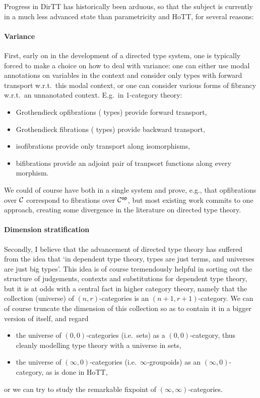 \documentclass{lmcs} %
\theoremstyle{plain}\newtheorem{satz}[thm]{Satz} %
\theoremstyle{plain}
\theoremstyle{definition}
\begin{document}
Progress in DirTT has historically been arduous, so that the subject is currently in a much less advanced state than parametricity and HoTT, for several reasons:

\paragraph{Variance}
First, early on in the development of a directed type system, one is typically forced to make a choice on how to deal with variance: one can either use modal annotations on variables in the context and consider only \covarfib{} types with forward transport w.r.t.\ this modal context, or one can consider various forms of fibrancy w.r.t.\ an unnanotated context.
E.g.\ in 1-category theory:
\begin{itemize}
	\item Grothendieck opfibrations (\covarfib{} types) provide forward transport,
	\item Grothendieck fibrations (\contravarfib{} types) provide backward transport,
	\item isofibrations provide only transport along isomorphisms,
	\item bifibrations provide an adjoint pair of tranpsort functions along every morphism.
\end{itemize}
We could of course have both in a single system and prove, e.g., that opfibrations over ${\mathcal{C}}$ correspond to fibrations over ${\mathcal{C}}^{\mathsf{op}}$,
but most existing work commits to one approach, creating some divergence in the literature on directed type theory.

\paragraph{Dimension stratification}
Secondly, I believe that the advancement of directed type theory has suffered from the idea that `in dependent type theory, types are just terms, and universes are just big types'.
This idea is of course tremendously helpful in sorting out the structure of judgements, contexts and substitutions for dependent type theory, but it is at odds with a central fact in higher category theory, namely that the collection (universe) of $(n, r)$-categories is an $(n+1, r+1)$-category.
We can of course truncate the dimension of this collection so as to contain it in a bigger version of itself, and regard
\begin{itemize}
	\item the universe of $(0, 0)$-categories (i.e.\ sets) as a $(0, 0)$-category, thus cleanly modelling type theory with a universe in sets,
	\item the universe of $(\infty, 0)$-categories (i.e.\ $\infty$-groupoids) as an $(\infty, 0)$-category, as is done in HoTT,
\end{itemize}
or we can try to study the remarkable fixpoint of $(\infty,\infty)$-categories.
\end{document}
